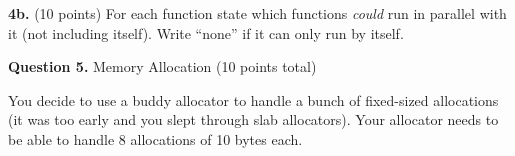 \documentclass[12pt]{article}
\begin{document}
\vspace{1em}

\textbf{4b.} (10 points) For each function state which functions \textit{could}
run in parallel with it (not including itself).
Write ``none'' if it can only run by itself.

\vspace{1em}


\newpage

\textbf{Question 5.} Memory Allocation (10 points total)

\vspace{1em}

You decide to use a buddy allocator to handle a bunch of fixed-sized allocations
(it was too early and you slept through slab allocators).
Your allocator needs to be able to handle 8 allocations of 10 bytes each.
\end{document}
